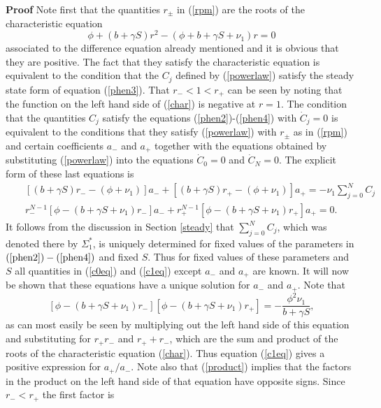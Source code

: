 \documentclass{article}
\begin{document}
\noindent
{\bf Proof} Note first that the quantities $r_{\pm}$ in (\ref{rpm}) are
the roots of the characteristic equation 
\begin{equation}\label{char}
\phi+(b+\gamma S)r^2-(\phi+b+\gamma S+\nu_1)r=0
\end{equation}
associated to the difference equation already mentioned and it is obvious
that they are positive. The fact that they satisfy the characteristic equation
is equivalent to the condition that the $C_j$ defined by (\ref{powerlaw}) 
satisfy the steady state form of equation (\ref{phen3}). That $r_-<1<r_+$ can 
be seen by noting that the function on the left hand side of (\ref{char}) is 
negative at $r=1$. The condition that the quantities $C_j$ satisfy the equations
(\ref{phen2})-(\ref{phen4}) with $\dot C_j=0$ is equivalent to the conditions
that they satisfy (\ref{powerlaw}) with $r_{\pm}$ as in (\ref{rpm}) and certain 
coefficients $a_-$ and $a_+$ together with the equations obtained by 
substituting (\ref{powerlaw}) into the equations $\dot C_0=0$ and 
$\dot C_N=0$. The explicit form of these last equations is
\begin{eqnarray}
&&[(b+\gamma S)r_--(\phi+\nu_1)]a_-+[(b+\gamma S)r_+-(\phi+\nu_1)]a_+
=-\nu_1\sum_{j=0}^NC_j\label{c0eq}\\
&&r_-^{N-1}[\phi-(b+\gamma S+\nu_1)r_-]a_-+r_+^{N-1}[\phi-(b+\gamma S+\nu_1)
r_+]a_+=0.\label{c1eq}
\end{eqnarray}
It follows from the discussion in Section \ref{steady} that $\sum_{j=0}^NC_j$, 
which was denoted there by $\Sigma_1^*$, is uniquely determined for fixed values
of the parameters in $(\ref{phen2})-(\ref{phen4})$ and fixed $S$. Thus for 
fixed values of these parameters and $S$ all quantities in (\ref{c0eq}) and 
(\ref{c1eq}) except $a_-$ and $a_+$ are known. It will now be shown that these 
equations have a unique solution for $a_-$ and $a_+$. Note that
\begin{equation}\label{product}
[\phi-(b+\gamma S+\nu_1)r_-][\phi-(b+\gamma S+\nu_1)r_+]=
-\frac{\phi^2\nu_1}{b+\gamma S},
\end{equation}
as can most easily be seen by multiplying out the left hand side of this
equation and substituting for $r_+r_-$ and $r_++r_-$, which are the sum and 
product of the roots of the characteristic equation (\ref{char}). Thus equation 
(\ref{c1eq}) gives a positive expression for $a_+/a_-$. Note also that 
(\ref{product}) implies that the factors in the product on the left hand side
of that equation have opposite signs. Since $r_-<r_+$ the first factor is 
\end{document}
